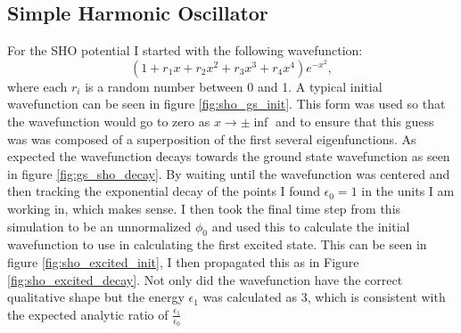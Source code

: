 \documentclass[]{article}
\begin{document}
\subsection{Simple Harmonic Oscillator}
For the SHO potential I started with the following wavefunction:
\begin{equation}
(1+r_1 x+r_2 x^2+r_3 x^3+r_4 x^4)e^{-x^2},
\end{equation}
where each $r_i$ is a random number between 0 and 1. A typical initial wavefunction can be seen in figure \ref{fig:sho_gs_init}. This form was used so that the wavefunction would go to zero as $x\to \pm\inf$ and to ensure that this guess was was composed of a superposition of the first several eigenfunctions. As expected the wavefunction decays towards the ground state wavefunction as seen in figure \ref{fig:gs_sho_decay}. By waiting until the wavefunction was centered  and then tracking the exponential decay of the points I found $\epsilon_0=1$ in the units I am working in, which makes sense. I then took the final time step from this simulation to be an unnormalized $\phi_0$ and used this to calculate the initial wavefunction to use in calculating the first excited state. This can be seen in figure \ref{fig:sho_excited_init}, I then propagated this as in Figure \ref{fig:sho_excited_decay}. Not only did the wavefunction have the correct qualitative shape but the energy $\epsilon_1$ was calculated as 3, which is consistent with the expected analytic ratio of $\frac{\epsilon_1}{\epsilon_0}$
\end{document}
